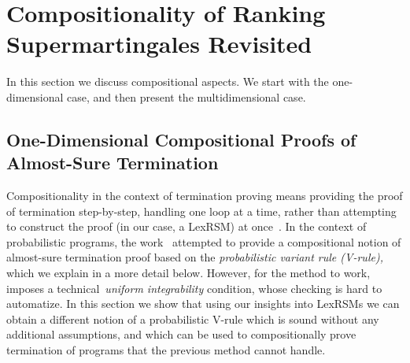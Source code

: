 \section{Compositionality of Ranking Supermartingales Revisited}
\label{sec:compositional}
In this section we discuss compositional aspects. We start with the 
one-dimensional case, and then present the multidimensional case.

\subsection{One-Dimensional Compositional Proofs of Almost-Sure Termination}

Compositionality in the context of termination proving means providing the 
proof of termination step-by-step, handling one loop at a time, rather than 
attempting to construct the proof (in our case, a LexRSM) at 
once~\cite{KSTW10:compositional-transition-invariants}. 
In the context of 
probabilistic programs, the work~\cite{HolgerPOPL} attempted to provide a 
compositional notion of almost-sure termination proof based on the 
\emph{probabilistic variant rule (V-rule),} which we explain in a more detail 
below. However, for the method to work,~\cite{HolgerPOPL} imposes a 
technical~\emph{uniform integrability} condition, whose checking is hard to 
automatize. In this 
section we show that using our insights into LexRSMs we 
can obtain a different notion of a probabilistic V-rule which is sound 
without any additional assumptions, and which can be used to compositionally 
prove termination 
of programs that the previous method cannot handle. 


